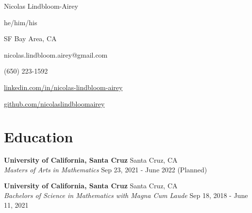 \documentclass[10pt,letterpaper]{article}
\begin{document}
\begin{minipage}[t]{0.6\textwidth}
{\Huge Nicolas Lindbloom-Airey}

he/him/his
\end{minipage}
\begin{minipage}[t]{0.4\textwidth}
SF Bay Area, CA 

 nicolas.lindbloom.airey@gmail.com

 (650) 223-1592 

 \href{https://www.linkedin.com/in/nicolas-lindbloom-airey/}{linkedin.com/in/nicolas-lindbloom-airey} 

 \href{https://github.com/nicolaslindbloomairey}{github.com/nicolaslindbloomairey} 

\end{minipage}


\section*{Education} \hrulefill 

\textbf{University of California, Santa Cruz} \hfill  Santa Cruz, CA\\
\textit{Masters of Arts in Mathematics} \hfill  Sep 23, 2021 - June 2022 (Planned)

\textbf{University of California, Santa Cruz} \hfill  Santa Cruz, CA\\
\textit{Bachelors of Science in Mathematics with Magna Cum Laude} \hfill  Sep 18, 2018 - June 11, 2021

%
%
\end{document}
